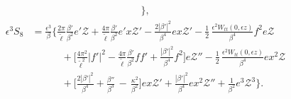 \documentclass[10pt, reqno]{amsart}
\numberwithin{equation}{section}
\theoremstyle{definition}
\begin{document}
{{\begin{align}
\Bigg\},
\end{align}
\begin{align}\label{S8}
 \epsilon^3S_8
& = \frac{\epsilon^3}\beta\Bigg\{
\frac{ 2\pi}{\tilde\ell} \frac{\beta'}{\beta^2} e'{\mathcal Z}
+\frac{4\pi}{{\tilde\ell}}\frac{\beta'}{\beta^2} e' x {\mathcal Z}'
-\frac{2|\beta'|^2} {\beta^4} e x\mathcal Z'
-\frac{1}{2}\, \frac{\epsilon^2W_{tt}(0, \epsilon z)}{\beta^4}f^2 e\mathcal Z
\nonumber\\[2mm]
&\qquad\quad
+\Big[\frac{4\pi^2}{{\tilde\ell}^2}|f'|^2
-\frac{4\pi}{{\tilde\ell}}\frac{\beta'}{\beta^2}ff'
+\frac{|\beta'|^2}{\beta^4} f^2
\Big]e {\mathcal Z}''
-\frac{1}{2}\, \frac{\epsilon^2W_{tt}(0, \epsilon z)}{\beta^4} e x^2{\mathcal Z}
\nonumber\\[2mm]
&\qquad\quad
+\Big[\frac{2|\beta'|^2}{\beta^4}
+\frac{\beta''} {\beta^3}
\,-\,\frac{\kappa^2}{\beta^2}
\Big]e x {\mathcal Z}'
+
\frac{|\beta'|^2}{\beta^4} e x^2{\mathcal Z}''
+ \frac1{\beta^2}e^3 {\mathcal Z}^3
\Bigg\}.
\end{align}

}}
\end{document}

